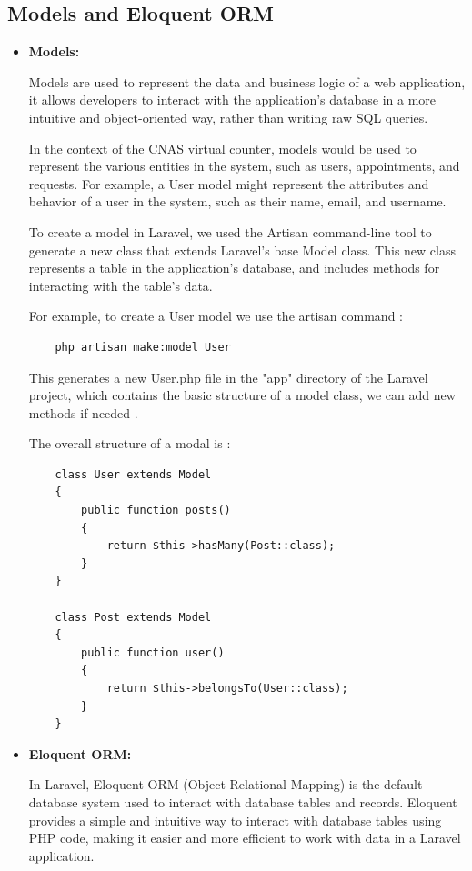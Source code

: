 \subsection{Models and Eloquent ORM}
\begin{itemize}
 \item \textbf{Models:}

Models are used to represent the data and business logic of a web application, it allows developers to interact with the application's database in a more intuitive and object-oriented way, rather than writing raw SQL queries.

In the context of the CNAS virtual counter, models would be used to represent the various entities in the system, such as users, appointments, and requests. For example, a User model might represent the attributes and behavior of a user in the system, such as their name, email, and username.

To create a model in Laravel, we used the Artisan command-line tool to generate a new class that extends Laravel's base Model class. This new class represents a table in the application's database, and includes methods for interacting with the table's data.

For example, to create a User model we use the artisan command : 
\begin{verbatim}
    php artisan make:model User
\end{verbatim}
This generates a new User.php file in the "app" directory of the Laravel project, which contains the basic structure of a model class, we can add new methods if needed .

The overall structure of a modal is : 
\begin{verbatim}
    class User extends Model
    {
        public function posts()
        {
            return $this->hasMany(Post::class);
        }
    }

    class Post extends Model
    {
        public function user()
        {
            return $this->belongsTo(User::class);
        }
    }
\end{verbatim}
\item \textbf{Eloquent ORM: }

In Laravel, Eloquent ORM (Object-Relational Mapping) is the default database system used to interact with database tables and records. Eloquent provides a simple and intuitive way to interact with database tables using PHP code, making it easier and more efficient to work with data in a Laravel application.


\end{itemize}

